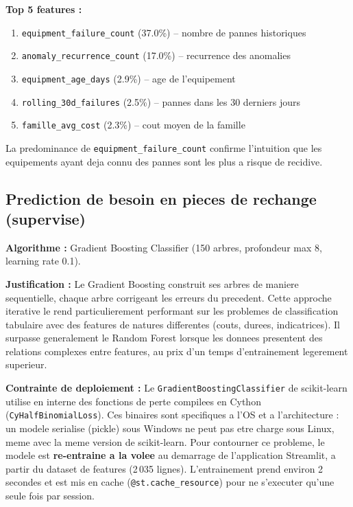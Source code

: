 \documentclass[12pt,a4paper]{article}
\begin{document}
\textbf{Top 5 features :}
\begin{enumerate}
  \item \texttt{equipment\_failure\_count} (37.0\%) -- nombre de pannes historiques
  \item \texttt{anomaly\_recurrence\_count} (17.0\%) -- recurrence des anomalies
  \item \texttt{equipment\_age\_days} (2.9\%) -- age de l'equipement
  \item \texttt{rolling\_30d\_failures} (2.5\%) -- pannes dans les 30 derniers jours
  \item \texttt{famille\_avg\_cost} (2.3\%) -- cout moyen de la famille
\end{enumerate}

La predominance de \texttt{equipment\_failure\_count} confirme l'intuition que les equipements ayant deja connu des pannes sont les plus a risque de recidive.

\subsection{Prediction de besoin en pieces de rechange (supervise)}

\textbf{Algorithme :} Gradient Boosting Classifier (150 arbres, profondeur max 8, learning rate 0.1).

\textbf{Justification :} Le Gradient Boosting construit ses arbres de maniere sequentielle, chaque arbre corrigeant les erreurs du precedent. Cette approche iterative le rend particulierement performant sur les problemes de classification tabulaire avec des features de natures differentes (couts, durees, indicatrices). Il surpasse generalement le Random Forest lorsque les donnees presentent des relations complexes entre features, au prix d'un temps d'entrainement legerement superieur.

\textbf{Contrainte de deploiement :} Le \texttt{GradientBoostingClassifier} de scikit-learn utilise en interne des fonctions de perte compilees en Cython (\texttt{CyHalfBinomialLoss}). Ces binaires sont specifiques a l'OS et a l'architecture : un modele serialise (pickle) sous Windows ne peut pas etre charge sous Linux, meme avec la meme version de scikit-learn. Pour contourner ce probleme, le modele est \textbf{re-entraine a la volee} au demarrage de l'application Streamlit, a partir du dataset de features (2\,035 lignes). L'entrainement prend environ 2 secondes et est mis en cache (\texttt{@st.cache\_resource}) pour ne s'executer qu'une seule fois par session.
\end{document}
